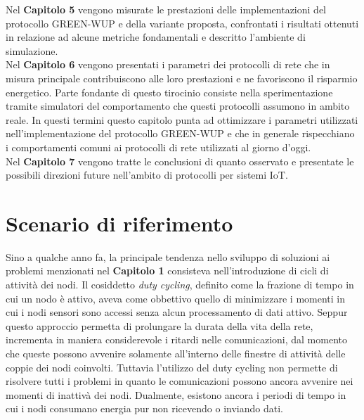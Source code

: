 \documentclass[binding=0.6cm,TFA]{sapthesis}
\begin{document}
Nel \textbf{Capitolo 5} vengono misurate le prestazioni delle implementazioni del protocollo GREEN-WUP e della variante proposta,
confrontati i risultati ottenuti in relazione ad alcune metriche fondamentali e descritto l'ambiente di simulazione.\\

Nel \textbf{Capitolo 6} vengono presentati i parametri dei protocolli di rete che in misura principale contribuiscono alle loro prestazioni e ne favoriscono
il risparmio energetico. Parte fondante di questo tirocinio consiste nella sperimentazione tramite simulatori del comportamento che questi protocolli
assumono in ambito reale. In questi termini questo capitolo punta ad ottimizzare i parametri utilizzati nell'implementazione del protocollo GREEN-WUP e
che in generale rispecchiano i comportamenti comuni ai protocolli di rete utilizzati al giorno d'oggi.\\

Nel \textbf{Capitolo 7} vengono tratte le conclusioni di quanto osservato e presentate le possibili direzioni future nell'ambito di protocolli per sistemi IoT.

\let\cleardoublepage    %
\clearpage
\let\cleardoublepage\clearpage  %

\chapter{Scenario di riferimento}

Sino a qualche anno fa, la principale tendenza nello sviluppo di soluzioni ai problemi menzionati nel \textbf{Capitolo 1} consisteva nell'introduzione di cicli di attività
dei nodi. Il cosiddetto \emph{duty cycling}, definito come la frazione di tempo in cui un nodo è attivo, aveva come obbettivo quello di minimizzare i momenti
in cui i nodi sensori sono accessi senza alcun processamento di dati attivo. Seppur questo approccio permetta di prolungare la durata della vita della rete,
incrementa in maniera considerevole i ritardi nelle comunicazioni, dal momento che queste possono avvenire solamente all'interno delle finestre di attività
delle coppie dei nodi coinvolti. Tuttavia l'utilizzo del duty cycling non permette di risolvere tutti i problemi in quanto le comunicazioni possono ancora
avvenire nei momenti di inattivà dei nodi. Dualmente, esistono ancora i periodi di tempo in cui i nodi consumano energia pur non ricevendo o inviando dati.\\
\end{document}
